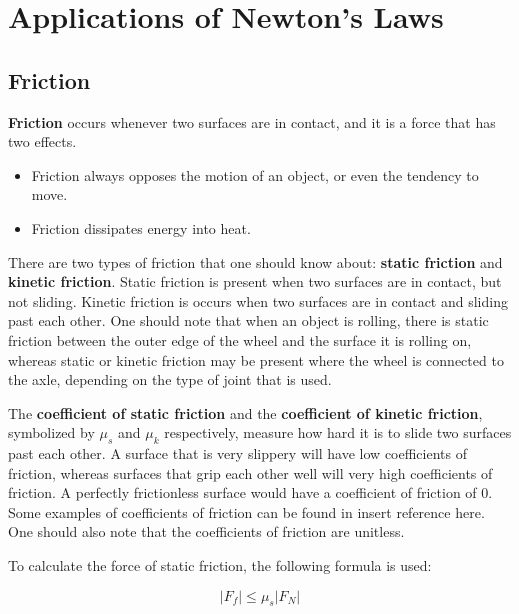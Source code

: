 	\section{Applications of Newton's Laws}
		\subsection{Friction}
		\textbf{Friction} occurs whenever two surfaces are in contact, and it is a force that has two effects.  
		\begin{itemize}
			\item Friction always opposes the motion of an object, or even the tendency to move.
			\item Friction dissipates energy into heat.
		\end{itemize}
		
		 
		There are two types of friction that one should know about: \textbf{static friction} and \textbf{kinetic friction}.  Static friction is present when two surfaces are in contact, but not sliding.  Kinetic friction is occurs when two surfaces are in contact and sliding past each other.  One should note that when an object is rolling, there is static friction between the outer edge of the wheel and the surface it is rolling on, whereas static or kinetic friction may be present where the wheel is connected to the axle, depending on the type of joint that is used.  
		
		The \textbf{coefficient of static friction}  and the \textbf{coefficient of kinetic friction}, symbolized by $\mu_s$ and $\mu_k$ respectively, measure how hard it is to slide two surfaces past each other.  A surface that is very slippery will have low coefficients of friction, whereas surfaces that grip each other well will very high coefficients of friction. A perfectly frictionless surface would have a coefficient of friction of 0.  Some examples of coefficients of friction can be found in \color{red} insert reference here\color{black}.  One should also note that the coefficients of friction are unitless.  
		
		To calculate the force of static friction, the following formula is used:
		\begin{mdframed}[backgroundcolor=orange!20!white]
			\begin{equation}
				|F_f| \leq \mu_s |F_N|  
				\label{eqn:frictionstatic}
			\end{equation}
		\end{mdframed}
	
